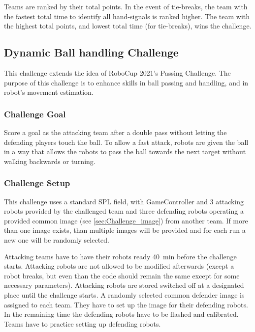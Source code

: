         Teams are ranked by their total points. In the event of tie-breaks, the team with the fastest total time to identify all hand-signals is ranked higher. The team with the highest total points, and lowest total time (for tie-breaks), wins the challenge.

\newpage

\subsection{Dynamic Ball handling Challenge}

    This challenge extends the idea of RoboCup 2021's Passing Challenge. The purpose of this challenge is to enhance skills in ball passing and handling, and in robot's movement estimation.

    \subsubsection{Challenge Goal}

        Score a goal as the attacking team after a double pass without letting the defending players touch the ball. To allow a fast attack, robots are given the ball in a way that allows the robots to pass the ball towards the next target without walking backwards or turning. 

    \subsubsection{Challenge Setup}

        This challenge uses a standard SPL field, with GameController and 3 attacking robots provided by the challenged team and three defending robots operating a provided common image (see \cref{sec:Challenge_image}) from another team. If more than one image exists, than multiple images will be provided and for each run a new one will be randomly selected.

        Attacking teams have to have their robots ready \qty{40}{\minute} before the challenge starts. Attacking robots are not allowed to be modified afterwards (except a robot breaks, but even than the code should remain the same except for some necessary parameters). Attacking robots are stored switched off at a designated place until the challenge starts. A randomly selected common defender image is assigned to each team. They have to set up the image for their defending robots. In the remaining time the defending robots have to be flashed and calibrated. Teams have to practice setting up defending robots.

